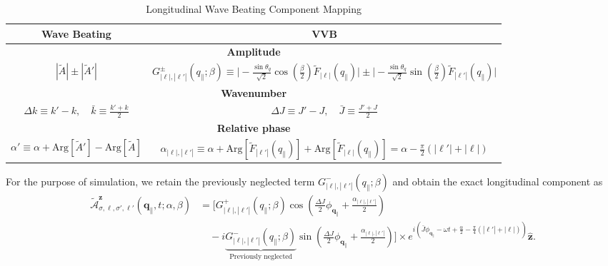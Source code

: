 \begin{table}[H]
\centering
\vspace{-1.5em} 
\caption{Longitudinal Wave Beating Component Mapping}
\label{tab:variable_mapping}

\setlength{\tabcolsep}{3pt}
\renewcommand{\arraystretch}{1.1}

\begin{tabular}{|c|c|}
\hline
\rule[-0.6ex]{0pt}{2.8ex}\textbf{Wave Beating} & \textbf{VVB} \\ \hline

\multicolumn{2}{|c|}{\rule[-0.5ex]{0pt}{2.5ex}\textbf{Amplitude}} \\ \hline
\rule[-2.5ex]{0pt}{6.2ex}
$|\tilde{A}| \pm |\tilde{A}'|$
& $G_{|\ell|,|\ell'|}^{\pm}(q_{\|}; \beta) \equiv \Big| -\tfrac{\sin\theta_q}{\sqrt{2}} \cos\left(\tfrac{\beta}{2}\right) \tilde{F}_{|\ell|}(q_{\|}) \Big| \pm \Big| -\tfrac{\sin\theta_q}{\sqrt{2}} \sin\left(\tfrac{\beta}{2}\right) \tilde{F}_{|\ell'|}(q_{\|}) \Big|$ \\ \hline

\multicolumn{2}{|c|}{\rule[-0.5ex]{0pt}{2.5ex}\textbf{Wavenumber}} \\ \hline
\rule[-1.5ex]{0pt}{4.2ex}
$\Delta k \equiv k' - k, \quad \bar{k} \equiv \tfrac{k' + k}{2}$
& $\Delta J \equiv J' - J, \quad \bar{J} \equiv \tfrac{J' + J}{2}$ \\ \hline

\multicolumn{2}{|c|}{\rule[-0.5ex]{0pt}{2.5ex}\textbf{Relative phase}} \\ \hline
\rule[-1.5ex]{0pt}{4.2ex}
$\alpha' \equiv \alpha + \text{Arg}[\tilde{A}'] - \text{Arg}[\tilde{A}]$
& $\alpha_{|\ell|,|\ell'|} \equiv \alpha + \text{Arg}[\tilde{F}_{|\ell'|}(q_{\|})] + \text{Arg}[\tilde{F}_{|\ell|}(q_{\|})] = \alpha - \tfrac{\pi}{2}(|\ell'| + |\ell|)$ \\ \hline

\end{tabular}
\end{table}

\noindent
For the purpose of simulation, we retain the previously neglected term $G_{\left|\ell\right|,\left|\ell'\right|}^{-}(q_{\parallel}; \beta)$ and obtain the exact longitudinal component as
\begin{equation}
\begin{aligned}
\tilde{\boldsymbol{\mathcal{A}}}_{\sigma,\ell,\sigma',\ell'}^{\boldsymbol{z}}(\boldsymbol{q}_{\|}, t; \alpha, \beta) 
&= \Big[ G_{|\ell|,|\ell'|}^{+}(q_{\|}; \beta) \cos \left( \tfrac{\Delta J}{2} \phi_{\boldsymbol{q}_{\|}} + \tfrac{\alpha_{|\ell|,|\ell'|}}{2} \right) \\
&\quad - i \underbrace{G_{|\ell|,|\ell'|}^{-}(q_{\|}; \beta)}_{\text{Previously neglected}} \sin \left( \tfrac{\Delta J}{2} \phi_{\boldsymbol{q}_{\|}} + \tfrac{\alpha_{|\ell|,|\ell'|}}{2} \right) \Big] \times e^{i \left( \bar{J}\phi_{\boldsymbol{q}_{\|}} - \omega t + \tfrac{\alpha}{2} - \tfrac{\pi}{4}(|\ell'| + |\ell|) \right)} \hat{\boldsymbol{z}}.
\end{aligned}
\label{longitudinal_exact}
\end{equation}

